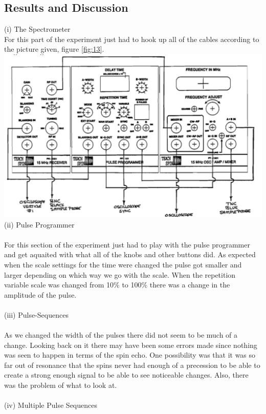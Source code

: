 \documentclass{article}
\begin{document}
{\begin{multicols}{2}
\section{Results and Discussion}
(i) The Spectrometer \\
For this part of the experiment just had to hook up all of the cables according 
to the picture given, figure \ref{fig:13}.
\center
\includegraphics[width=\linewidth]{pic-de-manual/coneccionesdelpanel.jpg}
\label{fig:13}
\justify
(ii) Pulse Programmer \\
\\
For this section of the experiment just had to play with the pulse programmer 
and get aquaited with what all of the knobs and other buttons did. As expected 
when the scale settings for the time were changed the pulse got smaller and 
larger depending on which way we go with the scale. When the repetition 
variable scale was changed from 10\% to 100\% there was a change in the 
amplitude of the pulse.\\
\\
(iii) Pulse-Sequences \\
\\
As we changed the width of the pulses there did not seem to be much of a 
change. Looking back on it there may have been some errors made since nothing 
was seen to happen in terms of the spin echo. One possibility was that it was 
so far out of resonance that the spins never had enough of a precession to be 
able to create a strong enough signal to be able to see noticeable changes. 
Also, there was the problem of what to look at. \\
\\
(iv) Multiple Pulse Sequences \\

\end{multicols}}
\end{document}
